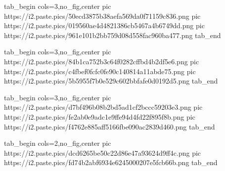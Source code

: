  
 
 
 
 
\zzSecCmtScr

\ifcmt
  tab_begin cols=3,no_fig,center
     pic https://i2.paste.pics/50ecd3875b38aefa569da0f71159c836.png
		 pic https://i2.paste.pics/019560ae4d4821386cb5467a4b6749dd.png
		 pic https://i2.paste.pics/961e101b2bb759d08d558fac960ba477.png
  tab_end
\fi

\ifcmt
  tab_begin cols=3,no_fig,center
	pic https://i2.paste.pics/84b1ca752b3c64f0282cffbd4b2df5e6.png
	pic https://i2.paste.pics/c4fbef0fcfc0fe90c140814a11abde75.png
	pic https://i2.paste.pics/5b5955f7b0e529c602bbfafe0d0192d5.png
  tab_end
\fi

\ifcmt
  tab_begin cols=3,no_fig,center
		pic https://i2.paste.pics/d7bf496b08b2bd5ad1cf2bccc59203e3.png
		pic https://i2.paste.pics/fe2ab0e9adc1e9ffe94d4fd22f895f8b.png
		pic https://i2.paste.pics/f4762e885aff5166fbe090ac2839d460.png
  tab_end
\fi

\ifcmt
  tab_begin cols=2,no_fig,center
	  pic https://i2.paste.pics/dcd6265be50c22d86e47a93624d9ff4c.png
		pic https://i2.paste.pics/fd74b2abf6934e6245000207e5fcb66b.png
  tab_end
\fi

